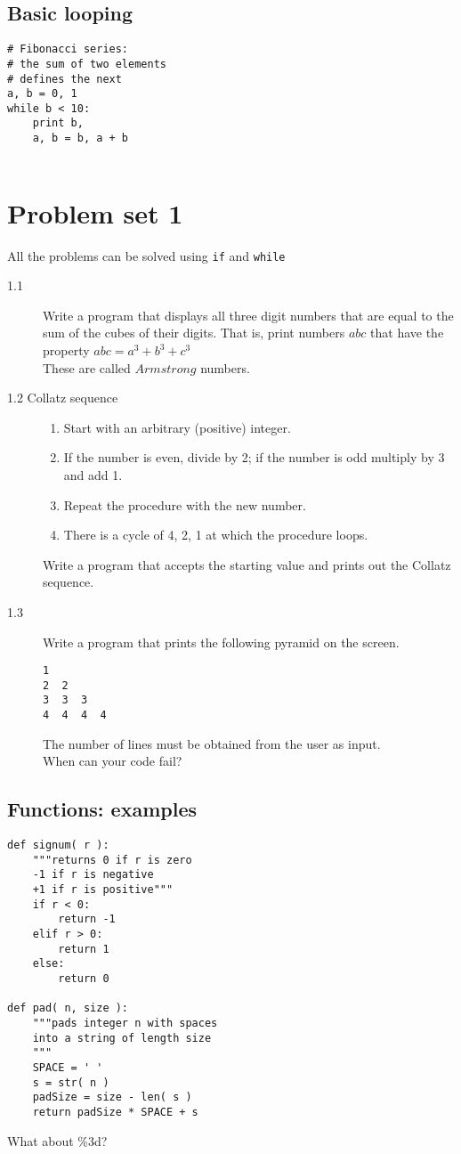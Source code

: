\documentclass[12pt]{article}
\begin{document}
\subsection{Basic looping}
  \begin{verbatim}
# Fibonacci series:
# the sum of two elements
# defines the next
a, b = 0, 1
while b < 10:
    print b,
    a, b = b, a + b
 
\end{verbatim}

\section{Problem set 1}
All the problems can be solved using \texttt{if} and \texttt{while} 
\begin{description}
  \item[1.1] Write a program that displays all three digit numbers that are equal to the sum of the cubes of their digits. That is, print numbers $abc$ that have the property $abc = a^3 + b^3 + c^3$\\
These are called $Armstrong$ numbers.
  
\item[1.2 Collatz sequence]
\begin{enumerate}
  \item Start with an arbitrary (positive) integer. 
  \item If the number is even, divide by 2; if the number is odd multiply by 3 and add 1.
  \item Repeat the procedure with the new number.
  \item There is a cycle of 4, 2, 1 at which the procedure loops.
\end{enumerate}
    Write a program that accepts the starting value and prints out the Collatz sequence.

\item[1.3]
  Write a program that prints the following pyramid on the screen. 
  \begin{verbatim}
1
2  2
3  3  3
4  4  4  4
  \end{verbatim}
The number of lines must be obtained from the user as input.\\
When can your code fail?
\end{description}

\subsection{Functions: examples}
  \begin{verbatim}
def signum( r ):
    """returns 0 if r is zero
    -1 if r is negative
    +1 if r is positive"""
    if r < 0:
        return -1
    elif r > 0:
        return 1
    else:
        return 0

def pad( n, size ): 
    """pads integer n with spaces
    into a string of length size
    """
    SPACE = ' '
    s = str( n )
    padSize = size - len( s )
    return padSize * SPACE + s
  \end{verbatim}
What about \%3d?
\end{document}
